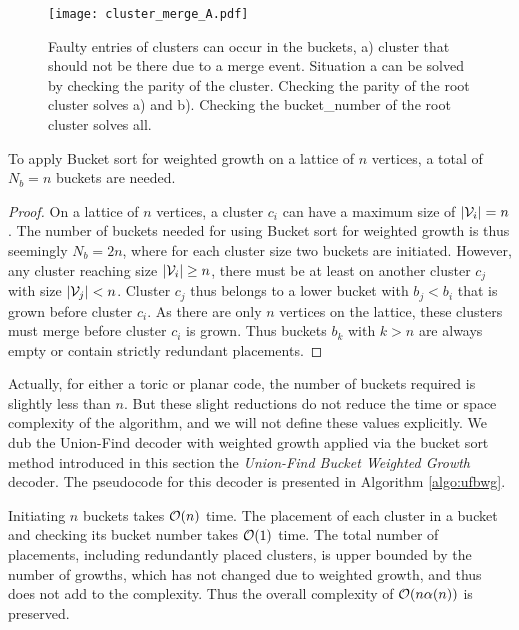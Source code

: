 \begin{figure}
  \centering
  \texttt{[image: cluster\_merge\_A.pdf]}
  \caption{Faulty entries of clusters can occur in the buckets, a) cluster that should not be there due to a merge event. Situation a can be solved by checking the parity of the cluster. Checking the parity of the root cluster solves a) and b). Checking the bucket\_number of the root cluster solves all.}\label{3.fig.clustermergeB}
\end{figure}


\begin{lemma}\label{lem:numbuckets}
  To apply Bucket sort for weighted growth on a lattice of $n$ vertices, a total of $N_b = n$ buckets are needed. 
\end{lemma}
\begin{proof}
  On a lattice of $n$ vertices, a cluster $c_i$ can have a maximum size of $|\mathcal{V}_i|=n$. The number of buckets needed for using Bucket sort for weighted growth is thus seemingly $N_b = 2n$, where for each cluster size two buckets are initiated. However, any cluster reaching size $|\mathcal{V}_i|\geq n$, there must be at least on another cluster $c_j$ with size $|\mathcal{V}_j|<n$. Cluster $c_j$ thus belongs to a lower bucket with $b_j < b_i$ that is grown before cluster $c_i$. As there are only $n$ vertices on the lattice, these clusters must merge before cluster $c_i$ is grown. Thus buckets $b_k$ with $k>n$ are always empty or contain strictly redundant placements.
\end{proof}

Actually, for either a toric or planar code, the number of buckets required is slightly less than $n$. But these slight reductions do not reduce the time or space complexity of the algorithm, and we will not define these values explicitly. We dub the Union-Find decoder with weighted growth applied via the bucket sort method introduced in this section the \emph{Union-Find Bucket Weighted Growth} decoder. The pseudocode for this decoder is presented in Algorithm \ref{algo:ufbwg}.  

Initiating $n$ buckets takes $\mathcal{O}(n)$ time. The placement of each cluster in a bucket and checking its bucket number takes $\mathcal{O}(1)$ time. The total number of placements, including redundantly placed clusters, is upper bounded by the number of growths, which has not changed due to weighted growth, and thus does not add to the complexity. Thus the overall complexity of $\mathcal{O}(n\alpha(n))$ is preserved. 

